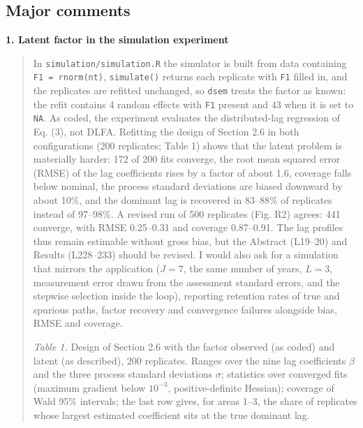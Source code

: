 \documentclass[11pt]{article}
\begin{document}
\subsection{Major comments}\label{major-comments}

\textbf{1. Latent factor in the simulation experiment}

\begin{quote}
In \texttt{simulation/simulation.R} the simulator is built from data
containing \texttt{F1\ =\ rnorm(nt)}, \texttt{simulate()} returns each
replicate with \texttt{F1} filled in, and the replicates are refitted
unchanged, so \texttt{dsem} treats the factor as known: the refit
contains 4 random effects with \texttt{F1} present and 43 when it is set
to \texttt{NA}. As coded, the experiment evaluates the distributed-lag
regression of Eq. (3), not DLFA. Refitting the design of Section 2.6 in
both configurations (200 replicates; Table 1) shows that the latent
problem is materially harder: 172 of 200 fits converge, the root mean
squared error (RMSE) of the lag coefficients rises by a factor of about
1.6, coverage falls below nominal, the process standard deviations are
biased downward by about 10\%, and the dominant lag is recovered in
83--88\% of replicates instead of 97--98\%. A revised run of 500
replicates (Fig. R2) agrees: 441 converge, with RMSE 0.25--0.31 and
coverage 0.87--0.91. The lag profiles thus remain estimable without
gross bias, but the Abstract (L19--20) and Results (L228--233) should be
revised. I would also ask for a simulation that mirrors the application
(\(J = 7\), the same number of years, \(L = 3\), measurement error drawn
from the assessment standard errors, and the stepwise selection inside
the loop), reporting retention rates of true and spurious paths, factor
recovery and convergence failures alongside bias, RMSE and coverage.

\emph{Table 1.} Design of Section 2.6 with the factor observed (as
coded) and latent (as described), 200 replicates. Ranges over the nine
lag coefficients \(\beta\) and the three process standard deviations
\(\sigma\); statistics over converged fits (maximum gradient below
\(10^{-3}\), positive-definite Hessian); coverage of Wald 95\%
intervals; the last row gives, for areas 1--3, the share of replicates
whose largest estimated coefficient sits at the true dominant lag.


\end{quote}
\end{document}
